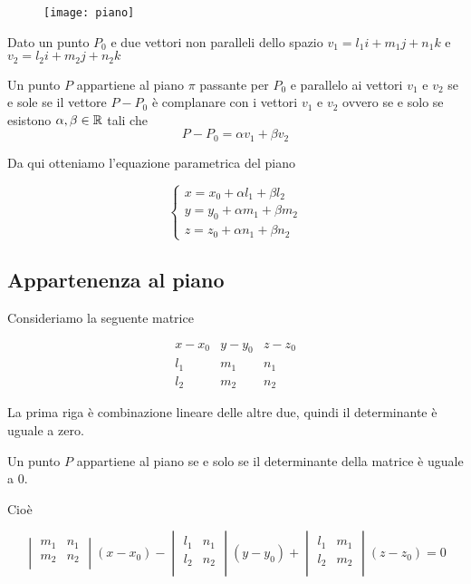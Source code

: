 \begin{figure}[H]
\texttt{[image: piano]}
\centering
\end{figure}

Dato un punto $P_0$ e due vettori non paralleli dello spazio $v_1=l_1i+m_1j+n_1k$ e $v_2=l_2i+m_2j+n_2k$

Un punto $P$ appartiene al piano  $\pi$ passante per $P_0$ e parallelo ai vettori $v_1$ e $v_2$ se e sole se il vettore $P-P_0$ è complanare con i vettori $v_1$ e $v_2$ ovvero se e solo se esistono $\alpha, \beta \in \mathbb{R}$ tali che $$P-P_0 = \alpha v_1 + \beta v_2$$

Da qui otteniamo l'equazione parametrica del piano

$$
\begin{cases}
x = x_0 + \alpha l_1 + \beta l_2 \\
y = y_0 + \alpha m_1 + \beta m_2 \\
z = z_0 + \alpha n_1 + \beta n_2
\end{cases}
$$

\subsection{Appartenenza al piano}

Consideriamo la seguente matrice

$$
\begin{matrix}
x-x_0 & y-y_0 & z-z_0 \\
l_1 & m_1 & n_1 \\
l_2 & m_2 & n_2
\end{matrix}
$$

La prima riga è combinazione lineare delle altre due, quindi il determinante è uguale a zero.

Un punto $P$ appartiene al piano se e solo se il determinante della matrice è uguale a 0.

Cioè

$$
\begin{vmatrix}
m_1 & n_1 \\
m_2 & n_2 \\
\end{vmatrix}
(x-x_0)
-
\begin{vmatrix}
l_1 & n_1 \\
l_2 & n_2 \\
\end{vmatrix}
(y-y_0)
+
\begin{vmatrix}
l_1 & m_1 \\
l_2 & m_2 \\
\end{vmatrix}
(z-z_0) = 0
$$

